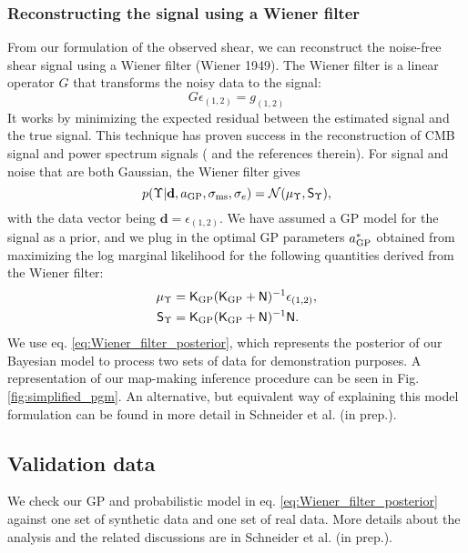 \subsubsection{Reconstructing the signal using a Wiener filter}
From our formulation of the observed shear, 
we can reconstruct the noise-free shear signal using a Wiener filter (Wiener 1949). 
The Wiener filter is a linear operator $G$ that transforms the noisy
data to the signal:
\begin{equation}
	G\epsilon_{(1, 2)} = g_{(1, 2)}
\end{equation}
It works by minimizing the expected residual between the estimated signal and the true
signal. This technique has proven success in the reconstruction of CMB signal
and power spectrum signals (\citealt{Elsner2013} and the references therein).
For signal and noise that are both Gaussian, the Wiener filter gives 
\begin{equation}
	p(\Upsilon| \mathbf{d}, a_{\rm GP}, \sigma_{\rm ms}, \sigma_e) = \mathcal{N}(\mu_\Upsilon,
	\mathsf{S}_\Upsilon),
	\label{eq:Wiener_filter_posterior}
\end{equation}
with the data vector being $\mathbf{d} = \epsilon_{(1, 2)}$. We have assumed 
a GP model for the signal as a prior, and we plug in the
optimal GP parameters $a_{\rm GP}^*$ obtained from maximizing the log marginal
likelihood for the following quantities derived from the Wiener filter:
\begin{align}
\mu_\Upsilon & = \mathsf{K}_{\rm GP}(\mathsf{K}_{\rm GP} + \mathsf{N})^{-1}
\epsilon_{(1, 2)}, \\
\mathsf{S}_\Upsilon & = \mathsf{K}_{\rm GP}(\mathsf{K}_{\rm GP} +
\mathsf{N})^{-1}\mathsf{N}.
\end{align}
We use eq. \ref{eq:Wiener_filter_posterior}, which represents the posterior
of our Bayesian model to process two sets of
data for demonstration purposes. A representation of our map-making inference procedure can be seen in Fig. 
\ref{fig:simplified_pgm}. An alternative, but equivalent way of explaining this
model formulation can be found in more detail in Schneider et al. (in prep.).

\subsection{Validation data}
We check our GP and probabilistic model in eq. \ref{eq:Wiener_filter_posterior}
against one set of synthetic data and one set of real data.
More details about the analysis and the related discussions are in Schneider et 
al. (in prep.).

